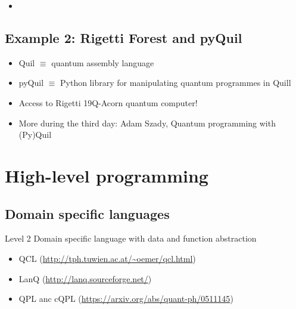 \documentclass{beamer}
\begin{document}
\begin{frame}{\insertsection}{\insertsubsection}
    \begin{itemize}
        \item 
    \end{itemize}
    
\end{frame}


\subsection{Example 2: Rigetti Forest and pyQuil}

\begin{frame}{\insertsection}{\insertsubsection}
	\begin{itemize}
        \item<1-> Quil $\equiv$ quantum assembly language
        \item<2-> pyQuil $\equiv$ Python library for manipulating quantum 
        programmes in Quill
        \item<3-> Access to Rigetti 19Q-Acorn quantum computer!
        \item<4-> More during the third day: Adam Szady, Quantum programming 
        with (Py)Quil
    \end{itemize}
\end{frame}


\section{High-level programming}


\subsection{Domain specific languages}

\begin{frame}{\insertsection}{\insertsubsection}

\begin{block}{Level 2}
Domain specific language with data and function abstraction
\end{block}

\begin{itemize}
    \item QCL (\url{http://tph.tuwien.ac.at/~oemer/qcl.html})
    \item LanQ (\url{http://lanq.sourceforge.net/})
    \item QPL anc cQPL (\url{https://arxiv.org/abs/quant-ph/0511145})
\end{itemize}
\end{frame}
\end{document}
